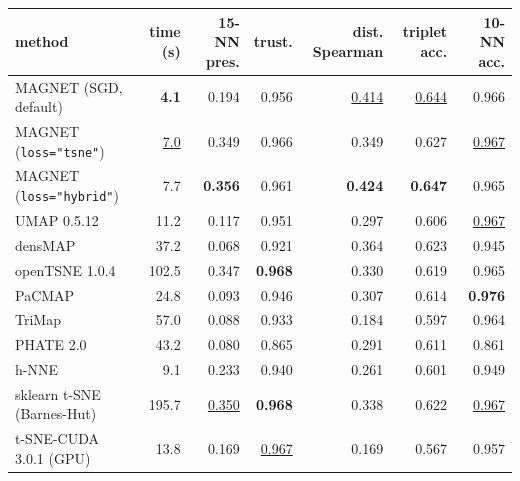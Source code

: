 \begin{tabular}{lrrrrrr}
\toprule
method & time (s) & 15-NN pres. & trust. & dist. Spearman & triplet acc. & 10-NN acc. \\
\midrule
MAGNET (SGD, default) & \textbf{4.1} & 0.194 & 0.956 & \underline{0.414} & \underline{0.644} & 0.966 \\
MAGNET (\texttt{loss="tsne"}) & \underline{7.0} & 0.349 & 0.966 & 0.349 & 0.627 & \underline{0.967} \\
MAGNET (\texttt{loss="hybrid"}) & 7.7 & \textbf{0.356} & 0.961 & \textbf{0.424} & \textbf{0.647} & 0.965 \\
UMAP 0.5.12 & 11.2 & 0.117 & 0.951 & 0.297 & 0.606 & \underline{0.967} \\
densMAP  & 37.2 & 0.068 & 0.921 & 0.364 & 0.623 & 0.945 \\
openTSNE 1.0.4 & 102.5 & 0.347 & \textbf{0.968} & 0.330 & 0.619 & 0.965 \\
PaCMAP & 24.8 & 0.093 & 0.946 & 0.307 & 0.614 & \textbf{0.976} \\
TriMap & 57.0 & 0.088 & 0.933 & 0.184 & 0.597 & 0.964 \\
PHATE 2.0 & 43.2 & 0.080 & 0.865 & 0.291 & 0.611 & 0.861 \\
h-NNE & 9.1 & 0.233 & 0.940 & 0.261 & 0.601 & 0.949 \\
sklearn t-SNE (Barnes-Hut) & 195.7 & \underline{0.350} & \textbf{0.968} & 0.338 & 0.622 & \underline{0.967} \\
t-SNE-CUDA 3.0.1 (GPU) & 13.8 & 0.169 & \underline{0.967} & 0.169 & 0.567 & 0.957 \\
\bottomrule
\end{tabular}
